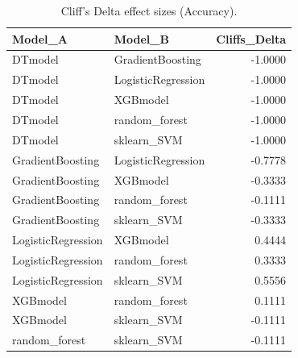 \begin{table}[t]
\centering
\begin{tabular}{llr}
\toprule
Model_A & Model_B & Cliffs_Delta \\
\midrule
DTmodel & GradientBoosting & -1.0000 \\
DTmodel & LogisticRegression & -1.0000 \\
DTmodel & XGBmodel & -1.0000 \\
DTmodel & random_forest & -1.0000 \\
DTmodel & sklearn_SVM & -1.0000 \\
GradientBoosting & LogisticRegression & -0.7778 \\
GradientBoosting & XGBmodel & -0.3333 \\
GradientBoosting & random_forest & -0.1111 \\
GradientBoosting & sklearn_SVM & -0.3333 \\
LogisticRegression & XGBmodel & 0.4444 \\
LogisticRegression & random_forest & 0.3333 \\
LogisticRegression & sklearn_SVM & 0.5556 \\
XGBmodel & random_forest & 0.1111 \\
XGBmodel & sklearn_SVM & -0.1111 \\
random_forest & sklearn_SVM & -0.1111 \\
\bottomrule
\end{tabular}
\caption{Cliff's Delta effect sizes (Accuracy).}
\label{tab:cliffs_Accuracy}
\end{table}
